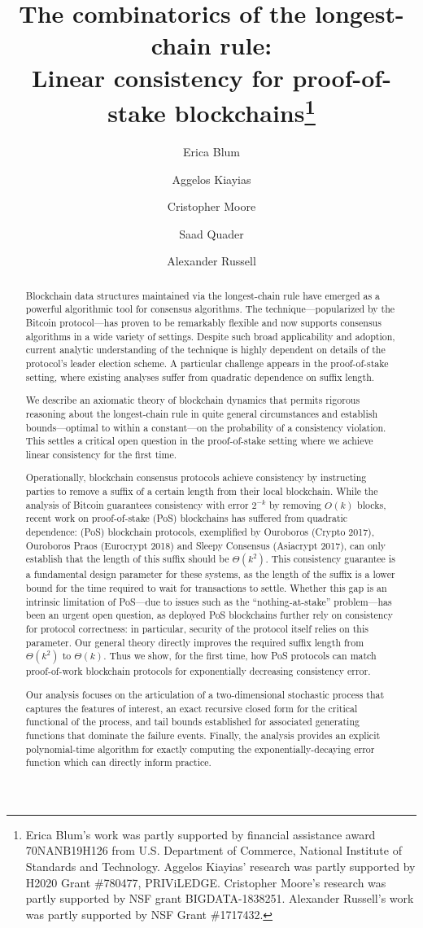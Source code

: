 \documentclass{article}
\title{%
  The combinatorics of the longest-chain rule:\\
  Linear consistency for proof-of-stake blockchains\thanks{
    Erica Blum's work was partly supported by financial assistance award 70NANB19H126 
    from U.S. Department of Commerce, National Institute of Standards and Technology. 
    Aggelos Kiayias' research was partly supported by H2020 Grant \#780477, PRIViLEDGE. 
    Cristopher Moore's research was partly supported by NSF grant BIGDATA-1838251. 
    Alexander Russell's work was partly supported by NSF Grant \#1717432.
  }
  }
\author[1]{Erica Blum}
\author[2,5]{Aggelos Kiayias}
\author[3]{Cristopher Moore}
\author[4]{Saad Quader}
\author[4,5]{Alexander Russell}
\affil[1]{University of Maryland, College Park}
\affil[2]{University of Edinburgh}
\affil[3]{Santa Fe Institute}
\affil[4]{University of Connecticut}
\affil[5]{IOHK}
\theoremstyle{definition}
\begin{document}
\maketitle

\begin{abstract}
  Blockchain data structures maintained via the longest-chain rule
  have emerged as a powerful algorithmic tool for consensus
  algorithms. The technique---popularized by the Bitcoin
  protocol---has proven to be remarkably flexible and now supports
  consensus algorithms in a wide variety of settings. Despite such
  broad applicability and adoption, current analytic understanding of
  the technique is highly dependent on details of the protocol's
  leader election scheme. A particular challenge appears in the
  proof-of-stake setting, where existing analyses suffer from
  quadratic dependence on suffix length.

  We describe an axiomatic theory of blockchain dynamics that permits
  rigorous reasoning about the longest-chain rule in quite general
  circumstances and establish bounds---optimal to within a
  constant---on the probability of a consistency violation. This settles
  a critical open question in the proof-of-stake setting where we
  achieve linear consistency for the first time.

  Operationally, blockchain consensus protocols achieve consistency by
  instructing parties to remove a suffix of a certain length from
  their local blockchain. While the analysis of Bitcoin guarantees
  consistency with error $2^{-k}$ by removing $O(k)$ blocks, recent
  work on proof-of-stake (PoS) blockchains has suffered from quadratic
  dependence: (PoS) blockchain protocols, exemplified by Ouroboros
  (Crypto 2017), Ouroboros Praos (Eurocrypt 2018) and Sleepy Consensus
  (Asiacrypt 2017), can only establish that the length of this suffix
  should be $\Theta(k^2)$.  This consistency guarantee is a
  fundamental design parameter for these systems, as the length of the
  suffix is a lower bound for the time required to wait for
  transactions to settle.  Whether this gap is an intrinsic limitation
  of PoS---due to issues such as the ``nothing-at-stake''
  problem---has been an urgent open question, as deployed PoS
  blockchains further rely on consistency for protocol correctness: in
  particular, security of the protocol itself relies on this
  parameter. Our general theory directly improves the required suffix
  length from $\Theta(k^2)$ to $\Theta(k)$. Thus we show, for the
  first time, how PoS protocols can match proof-of-work blockchain
  protocols for exponentially decreasing consistency error.

  Our analysis focuses on the articulation of a two-dimensional stochastic
  process that captures the features of interest, an exact recursive
  closed form for the critical functional of the process, and tail
  bounds established for associated generating functions that dominate
  the failure events. Finally, the analysis provides an explicit
  polynomial-time algorithm for exactly computing the
  exponentially-decaying error function which can directly inform
  practice.
\end{abstract}
\end{document}
